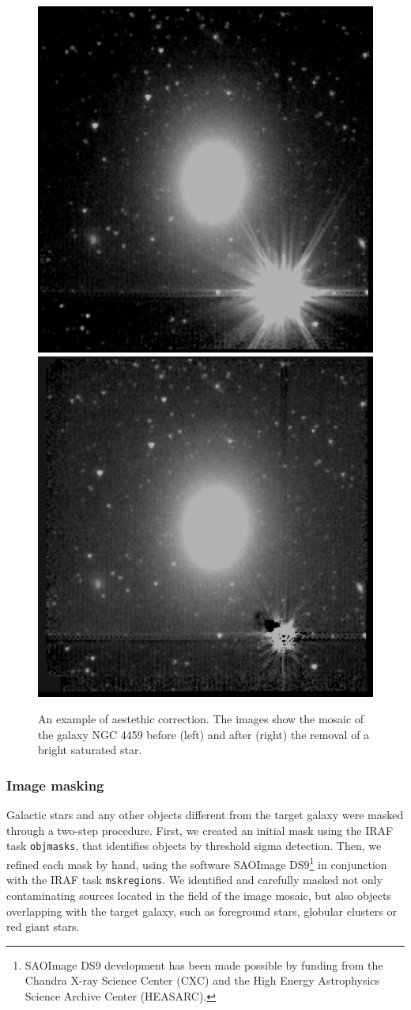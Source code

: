 \documentclass[preprint2]{emulateapj}
\begin{document}
\begin{figure}[h]
\begin{center}
\includegraphics[width=0.49\columnwidth]{images/n4459brightstar.eps}
\includegraphics[width=0.49\columnwidth]{images/n4459nobrightstar.eps}
\caption{An example of aestethic correction.
The images show the mosaic of the galaxy NGC 4459 before (left) and after (right) the removal 
of a bright saturated star.}
\label{fig:aesth}
\end{center}
\end{figure}

\subsubsection{Image masking}
Galactic stars and any other objects different from the target galaxy 
were masked through a two-step procedure.
First, we created an initial mask using the IRAF task 
{\tt objmasks}, %
that identifies objects by threshold sigma detection.
Then, we refined each mask by hand, using the software 
SAOImage DS9\footnote{SAOImage DS9 development has been made possible by funding 
from the Chandra X-ray Science Center (CXC) 
and the High Energy Astrophysics Science Archive Center (HEASARC).} 
in conjunction with the IRAF task 
{\tt mskregions}. %
We identified and carefully masked not only contaminating sources located in the field of the image mosaic,
but also objects overlapping with the target galaxy, such as foreground stars, globular clusters or red giant stars.
\end{document}
